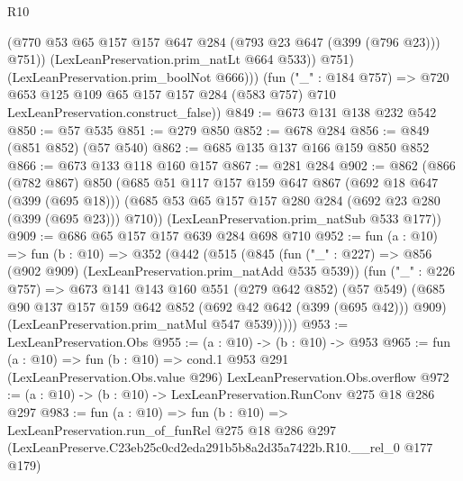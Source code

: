 \begin{lexlean}{R10}
\begin{coremodule}
                (@770 @53 @65 @157 @157 @647 @284 (@793 @23 @647 (@399 (@796 @23))) @751))
              (LexLeanPreservation.prim_natLt @664 @533))
            @751)
          (LexLeanPreservation.prim_boolNot @666)))
      (fun ("_" : @184 @757) =>
      @720 @653 @125 @109 @65 @157 @157 @284 (@583 @757) @710 LexLeanPreservation.construct_false))
@849 := @673 @131 @138 @232 @542
@850 := @57 @535
@851 := @279 @850
@852 := @678 @284
@856 := @849 (@851 @852) (@57 @540)
@862 := @685 @135 @137 @166 @159 @850 @852
@866 := @673 @133 @118 @160 @157
@867 := @281 @284
@902 := @862
    (@866
      (@782 @867)
      @850
      (@685
        @51
        @117
        @157
        @159
        @647
        @867
        (@692 @18 @647 (@399 (@695 @18)))
        (@685 @53 @65 @157 @157 @280 @284 (@692 @23 @280 (@399 (@695 @23))) @710))
      (LexLeanPreservation.prim_natSub @533 @177))
@909 := @686 @65 @157 @157 @639 @284 @698 @710
@952 := fun (a : @10) =>
  fun (b : @10) =>
  @352
    (@442
      (@515
        (@845
          (fun ("_" : @227) => @856 (@902 @909) (LexLeanPreservation.prim_natAdd @535 @539))
          (fun ("_" : @226 @757) =>
          @673
            @141
            @143
            @160
            @551
            (@279 @642 @852)
            (@57 @549)
            (@685 @90 @137 @157 @159 @642 @852 (@692 @42 @642 (@399 (@695 @42))) @909)
            (LexLeanPreservation.prim_natMul @547 @539)))))
@953 := LexLeanPreservation.Obs
@955 := (a : @10) -> (b : @10) -> @953
@965 := fun (a : @10) =>
  fun (b : @10) =>
  cond.{1} @953 @291 (LexLeanPreservation.Obs.value @296) LexLeanPreservation.Obs.overflow
@972 := (a : @10) -> (b : @10) -> LexLeanPreservation.RunConv @275 @18 @286 @297
@983 := fun (a : @10) =>
  fun (b : @10) =>
  LexLeanPreservation.run_of_funRel
    @275
    @18
    @286
    @297
    (LexLeanPreserve.C23eb25c0cd2eda291b5b8a2d35a7422b.R10.__rel_0 @177 @179)
\end{coremodule}
\end{lexlean}

